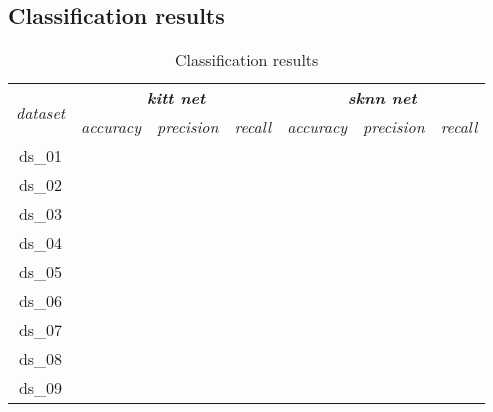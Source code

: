 \subsection{Classification results} \label{ssec:classification_results}

\begin{table}[H]
\centering
\caption{Classification results}
\label{tab:classification_results}
\begin{tabular}{|c|c|c|c|c|c|c|}
\hline
\multirow{2}{*}{\textit{dataset}} & \multicolumn{3}{c|}{\textit{\textbf{kitt net}}}         & \multicolumn{3}{c|}{\textit{\textbf{sknn net}}}         \\ \cline{2-7} 
                                  & \textit{accuracy} & \textit{precision} & \textit{recall} & \textit{accuracy} & \textit{precision} & \textit{recall} \\ \hline
ds\_01                            &                   &                    &                 &                   &                    &                 \\ \hline
ds\_02                            &                   &                    &                 &                   &                    &                 \\ \hline
ds\_03                            &                   &                    &                 &                   &                    &                 \\ \hline
ds\_04                            &                   &                    &                 &                   &                    &                 \\ \hline
ds\_05                            &                   &                    &                 &                   &                    &                 \\ \hline
ds\_06                            &                   &                    &                 &                   &                    &                 \\ \hline
ds\_07                            &                   &                    &                 &                   &                    &                 \\ \hline
ds\_08                            &                   &                    &                 &                   &                    &                 \\ \hline
ds\_09                            &                   &                    &                 &                   &                    &                 \\ \hline

\end{tabular}
\end{table}
